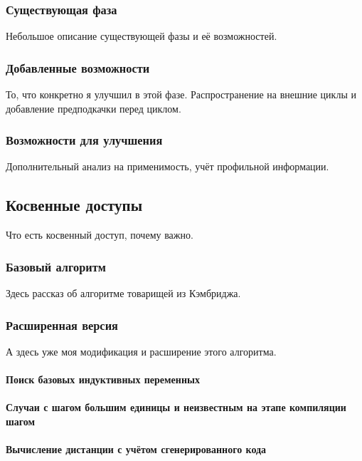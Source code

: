 \documentclass[12pt,a4paper]{article}
\begin{document}
\subsubsection{Существующая фаза}

Небольшое описание существующей фазы и её возможностей.

\subsubsection{Добавленные возможности}

То, что конкретно я улучшил в этой фазе. Распространение на внешние циклы и добавление предподкачки перед циклом.

\subsubsection{Возможности для улучшения}

Дополнительный анализ на применимость, учёт профильной информации.

\subsection{Косвенные доступы}

Что есть косвенный доступ, почему важно.

\subsubsection{Базовый алгоритм}

Здесь рассказ об алгоритме товарищей из Кэмбриджа.

\subsubsection{Расширенная версия}

А здесь уже моя модификация и расширение этого алгоритма.

\paragraph{Поиск базовых индуктивных переменных}

\paragraph{Случаи с шагом большим единицы и неизвестным на этапе компиляции шагом}

\paragraph{Вычисление дистанции с учётом сгенерированного кода}
\end{document}
